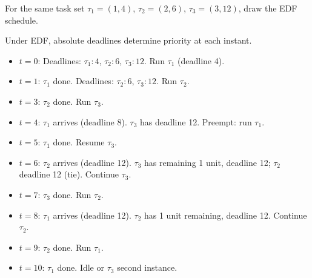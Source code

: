 \begin{example}
For the same task set $\tau_1 = (1,4)$, $\tau_2 = (2,6)$, $\tau_3 = (3,12)$, draw the EDF schedule.

\begin{solution}

Under EDF, absolute deadlines determine priority at each instant.

\begin{itemize}[nosep]
  \item $t=0$: Deadlines: $\tau_1:4$, $\tau_2:6$, $\tau_3:12$. Run $\tau_1$ (deadline 4).
  \item $t=1$: $\tau_1$ done. Deadlines: $\tau_2:6$, $\tau_3:12$. Run $\tau_2$.
  \item $t=3$: $\tau_2$ done. Run $\tau_3$.
  \item $t=4$: $\tau_1$ arrives (deadline 8). $\tau_3$ has deadline 12. Preempt: run $\tau_1$.
  \item $t=5$: $\tau_1$ done. Resume $\tau_3$.
  \item $t=6$: $\tau_2$ arrives (deadline 12). $\tau_3$ has remaining 1 unit, deadline 12; $\tau_2$ deadline 12 (tie). Continue $\tau_3$.
  \item $t=7$: $\tau_3$ done. Run $\tau_2$.
  \item $t=8$: $\tau_1$ arrives (deadline 12). $\tau_2$ has 1 unit remaining, deadline 12. Continue $\tau_2$.
  \item $t=9$: $\tau_2$ done. Run $\tau_1$.
  \item $t=10$: $\tau_1$ done. Idle or $\tau_3$ second instance.
\end{itemize}

\begin{figure}[H]
\centering
{}
\end{figure}
\end{solution}
\end{example}
